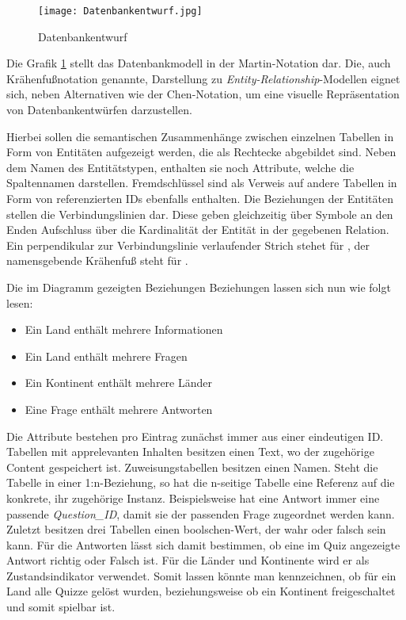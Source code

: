 \begin{figure} [h]
\centering
\texttt{[image: Datenbankentwurf.jpg]}
\caption{Datenbankentwurf}
\label{fig:db_model}
\end{figure}

Die Grafik \ref{fig:db_model} stellt das Datenbankmodell in der Martin-Notation dar. Die, auch Krähenfußnotation genannte, Darstellung zu \textit{Entity-Relationship}-Modellen eignet sich, neben Alternativen wie der Chen-Notation, um eine visuelle Repräsentation von Datenbankentwürfen darzustellen. 

Hierbei sollen die semantischen Zusammenhänge zwischen einzelnen Tabellen in Form von Entitäten aufgezeigt werden, die als Rechtecke abgebildet sind. Neben dem Namen des Entitätstypen, enthalten sie noch Attribute, welche die Spaltennamen darstellen. Fremdschlüssel sind als Verweis auf andere Tabellen in Form von referenzierten IDs ebenfalls enthalten. Die Beziehungen der Entitäten stellen die Verbindungslinien dar. Diese geben gleichzeitig über Symbole an den Enden Aufschluss über die Kardinalität der Entität in der gegebenen Relation. Ein perpendikular zur Verbindungslinie verlaufender Strich stehet für , der namensgebende Krähenfuß steht für .

Die im Diagramm gezeigten Beziehungen Beziehungen lassen sich nun wie folgt lesen:
\begin{itemize}
\item Ein Land enthält mehrere Informationen
\item Ein Land enthält mehrere Fragen
\item Ein Kontinent enthält mehrere Länder
\item Eine Frage enthält mehrere Antworten
\end{itemize}

Die Attribute bestehen pro Eintrag zunächst immer aus einer eindeutigen ID. Tabellen mit apprelevanten Inhalten besitzen einen Text, wo der zugehörige Content gespeichert ist. Zuweisungstabellen besitzen einen Namen. Steht die Tabelle in einer 1:n-Beziehung, so hat die n-seitige Tabelle eine Referenz auf die konkrete, ihr zugehörige Instanz. Beispielsweise hat eine Antwort immer eine passende \textit{Question\_ID}, damit sie der passenden Frage zugeordnet werden kann. Zuletzt besitzen drei Tabellen einen boolschen-Wert, der wahr oder falsch sein kann. Für die Antworten lässt sich damit bestimmen, ob eine im Quiz angezeigte Antwort richtig oder Falsch ist. Für die Länder und Kontinente wird er als Zustandsindikator verwendet. Somit lassen könnte man kennzeichnen, ob für ein Land alle Quizze gelöst wurden, beziehungsweise ob ein Kontinent freigeschaltet und somit spielbar ist.

